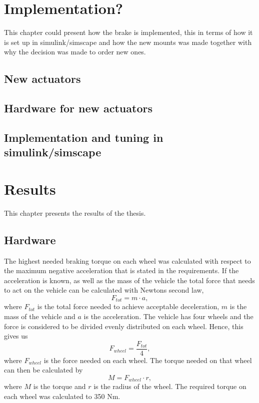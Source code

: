 \documentclass[a4paper,11pt]{kth-mag}
\begin{document}

\chapter{Implementation?}

This chapter could present how the brake is implemented, this in terms of how it is set up in simulink/simscape and how the new mounts was made together with why the decision was made to order new ones.

\section{New actuators}

\section{Hardware for new actuators}

\section{Implementation and tuning in simulink/simscape}




\chapter{Results}
This chapter presents the results of the thesis.
\section{Hardware}
The highest needed braking torque on each wheel was calculated with respect to the maximum negative acceleration that is stated in the requirements. If the acceleration is known, as well as the mass of the vehicle the total force that needs to act on the vehicle can be calculated with Newtons second law, 
\begin{equation}
F_{tot}=m\cdot a,
\end{equation}
where $F_{tot}$ is the total force needed to achieve acceptable deceleration, $m$ is the mass of the vehicle and $a$ is the acceleration. The vehicle has four wheels and the force is considered to be divided evenly distributed on each wheel. Hence, this gives us 
\begin{equation}
F_{wheel}=\frac{F_{tot}}{4},
\end{equation}
where $F_{wheel}$ is the force needed on each wheel. The torque needed on that wheel can then be calculated by 
\begin{equation}
M=F_{wheel}\cdot r,
\end{equation}
where $M$ is the torque and $r$ is the radius of the wheel. The required torque on each wheel was calculated to 350 Nm.
\end{document}
